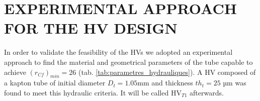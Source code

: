 \documentclass[3p,twocolumn,preprint]{elsarticle}
\begin{document}
\section{EXPERIMENTAL APPROACH FOR THE HV \mbox{DESIGN}}
\label{sec:EXPERIMENTAL APPROACH FOR THE HV DESIGN}
In order to validate the feasibility of the HVs we adopted an experimental approach to find the material and geometrical parameters of the tube capable to achieve $(r_{Cf})_{min}=26$ (tab. \ref{tab:parametres_hydrauliques}). A HV composed of a kapton tube \cite{Dupont2012} of initial diameter $D_t=1.05$mm and thickness $th_t=25$ µm was found to meet this hydraulic criteria. It will be called HV$_{T1}$ afterwards. 
\end{document}
